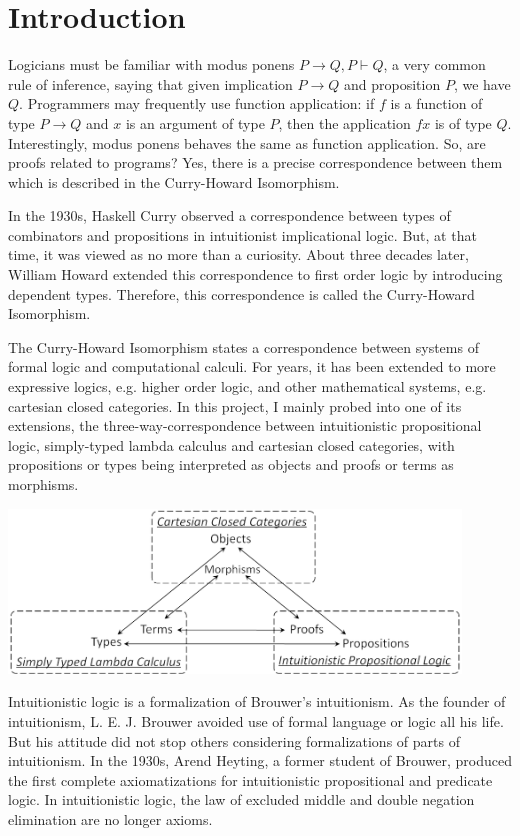 \section{Introduction}
\label{sec:introduction}

Logicians must be familiar with modus ponens $ P\to Q,P\vdash Q $, a very common rule of inference, saying that given implication $ P\to Q $ and proposition $ P $, we have $ Q $. Programmers may frequently use function application: if $ f $ is a function of type $ P\to Q $ and $ x $ is an argument of type $ P $, then the application $ f x $ is of type $ Q $. Interestingly, modus ponens behaves the same as function application. So, are proofs related to programs? Yes, there is a precise correspondence between them which is described in the Curry-Howard Isomorphism.

In the 1930s, Haskell Curry observed a correspondence between types of combinators and propositions in intuitionist implicational logic. But, at that time, it was viewed as no more than a curiosity. About three decades later, William Howard extended this correspondence to first order logic by introducing dependent types. Therefore, this correspondence is called the Curry-Howard Isomorphism.

The Curry-Howard Isomorphism states a correspondence between systems of formal logic and computational calculi. For years, it has been extended to more expressive logics, e.g. higher order logic, and other mathematical systems, e.g. cartesian closed categories. In this project, I mainly probed into one of its extensions, the three-way-correspondence between intuitionistic propositional logic, simply-typed lambda calculus and cartesian closed categories, with propositions or types being interpreted as objects and proofs or terms as morphisms.

\begin{center}
\includegraphics[width=0.9\textwidth]{./images/triangle}
\end{center}

Intuitionistic logic is a formalization of Brouwer’s intuitionism. As the founder of intuitionism, L. E. J. Brouwer avoided use of formal language or logic all his life. But his attitude did not stop others considering formalizations of parts of intuitionism. In the 1930s, Arend Heyting, a former student of Brouwer, produced the first complete axiomatizations for intuitionistic propositional and predicate logic. In intuitionistic logic, the law of excluded middle and double negation elimination are no longer axioms.

